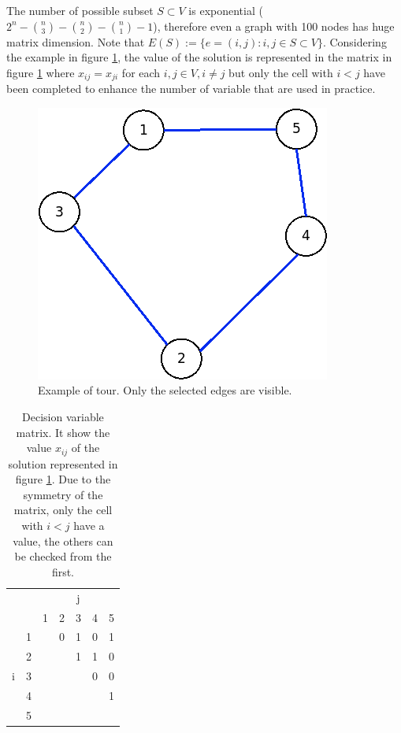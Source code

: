 The number of possible subset $ S \subset V $ is exponential ($ 2^{n} - \binom{n}{3} -\binom{n}{2} -\binom{n}{1} - 1 $), therefore even a graph with 100 nodes has huge matrix dimension. Note that $ E(S) := \{ e = (i,j): i,j \in S \subset V \}$.
Considering the example in figure \ref{fig:symTSP}, the value of the solution is represented in the matrix in figure \ref{tab:symTSP_solution} where $ x_{ij} = x_{ji} $ for each $ i,j \in V, i \ne j $ but only the cell with $ i < j $ have been completed to enhance the number of variable that are used in practice.
\begin{figure}[h]
	\centering
	\includegraphics[width=.2\columnwidth]{img/symTSP_example.png}
	\caption{Example of tour. Only the selected edges are visible.}
	\label{fig:symTSP}
\end{figure}

\begin{table}[h!]
	\begin{center}
		\caption{Decision variable matrix. It show the value $ x_{ij} $ of the solution represented in figure \ref{fig:symTSP}. Due to the symmetry of the matrix, only the cell with $ i < j $ have a value, the others can be checked from the first.}
		\label{tab:symTSP_solution}
		\begin{tabular}{cc|c|c|c|c|c|}
			 \multicolumn{2}{c}{} & \multicolumn{5}{c}{j} \\ %
			& \multicolumn{1}{c}{} & \multicolumn{1}{c}{1} & \multicolumn{1}{c}{2} & \multicolumn{1}{c}{3} & \multicolumn{1}{c}{4} & \multicolumn{1}{c}{5} \\ \cline{3-7}
			\multirow{5}{*}{i} 	& 1 & \cellcolor{Black} & 0 & 1 & 0 & 1 \\ \cline{3-7}
								& 2 &  & \cellcolor{Black} & 1 & 1 & 0 \\ \cline{3-7}
								& 3 &  &  & \cellcolor{Black} & 0 & 0 \\ \cline{3-7}
								& 4 &  &  &  & \cellcolor{Black} & 1 \\ \cline{3-7}
								& 5 &  &  &  &  & \cellcolor{Black} \\ \cline{3-7}
		\end{tabular}
	\end{center}
\end{table}



